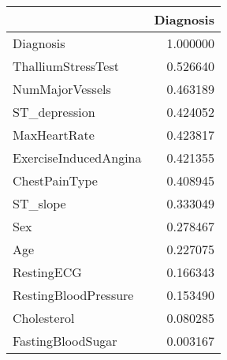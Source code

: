 \begin{tabular}{lr}
\toprule
{} &  Diagnosis \\
\midrule
Diagnosis             &   1.000000 \\
ThalliumStressTest    &   0.526640 \\
NumMajorVessels       &   0.463189 \\
ST\_depression         &   0.424052 \\
MaxHeartRate          &   0.423817 \\
ExerciseInducedAngina &   0.421355 \\
ChestPainType         &   0.408945 \\
ST\_slope              &   0.333049 \\
Sex                   &   0.278467 \\
Age                   &   0.227075 \\
RestingECG            &   0.166343 \\
RestingBloodPressure  &   0.153490 \\
Cholesterol           &   0.080285 \\
FastingBloodSugar     &   0.003167 \\
\bottomrule
\end{tabular}
